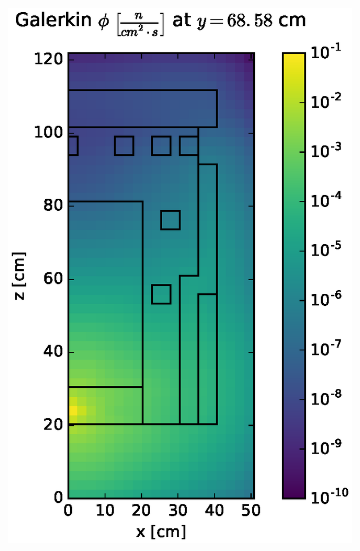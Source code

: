 \documentclass{article} %
\begin{document}
\begin{figure}[!htb]
\begin{subfigure}{0.4\textwidth}
\includegraphics[max height=0.445\textheight]
{img/dlvn-fwd-flux-gkn04.eps}
\end{subfigure}
\\
\begin{subfigure}{0.4\textwidth}

\end{subfigure}
\end{figure}
\end{document}
